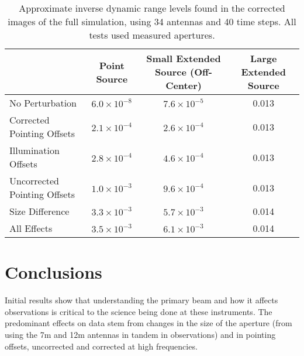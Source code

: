 \documentclass[11pt]{article}
\begin{document}
\begin{table}
    \centering
    \begin{tabular}{|p{3.5cm}|c|c|c|}
    \hline
    & Point Source & Small Extended Source \linebreak (Off-Center) & Large 
    Extended Source \\
    \hline
    No Perturbation & $6.0 \times 10^{-8}$ & $7.6 \times 10^{-5}$ & 0.013 \\
    \hline
    Corrected Pointing \linebreak Offsets & $2.1 \times 10^{-4}$ & $2.6 \times 
    10^{-4}$ & 0.013 \\
    \hline
    Illumination \linebreak Offsets & $2.8 \times 10^{-4}$ & $4.6 \times 
    10^{-4}$ & 0.013 \\
    \hline
    Uncorrected \linebreak Pointing Offsets & $1.0 \times 10^{-3}$ & $9.6 
    \times 10^{-4}$ & 0.013\\
    \hline
    Size Difference & $3.3 \times 10^{-3}$ & $5.7 \times 10^{-3}$ & 0.014 \\
    \hline
    All Effects\footnotemark & $3.5 \times 10^{-3}$ & $6.1 \times 10^{-3}$ & 
    0.014 \\
    \hline
    \end{tabular}
    \caption{
         Approximate inverse dynamic range levels found in the corrected images 
         of the full simulation, using 34 antennas and 40 time steps. All tests 
         used measured apertures.
    }
    \label{tab:rms-34ants}
\end{table}


\section{Conclusions}

Initial results show that understanding the primary beam and how it affects
observations is critical to the science being done at these instruments. The
predominant effects on data stem from changes in the size of the aperture
(from using the 7m and 12m antennas in tandem in observations) and in
pointing offsets, uncorrected and corrected at high frequencies. 
\end{document}
